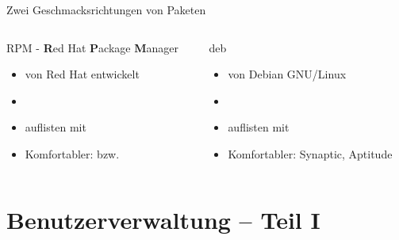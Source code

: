 \documentclass[aspectratio=43]{beamer}
\begin{document}
\begin{frame}{Zwei Geschmacksrichtungen von Paketen}
  \begin{columns}
    \begin{column}{0.52\textwidth}
      \begin{block}{RPM - \textbf{R}ed Hat \textbf{P}ackage \textbf{M}anager}
        \begin{itemize}
          \item von Red Hat entwickelt
          \item {}
          \item auflisten mit 
          \item Komfortabler:  bzw.  
        \end{itemize}
      \end{block}
    \end{column}
    \begin{column}{0.48\textwidth}
      \begin{block}{deb}
        \begin{itemize}
          \item von Debian GNU/Linux
          \item {}
          \item auflisten mit 
          \item Komfortabler: Synaptic, Aptitude
        \end{itemize}
      \end{block}
    \end{column}
  \end{columns}
\end{frame}


\section{Benutzerverwaltung -- Teil I}
\end{document}
